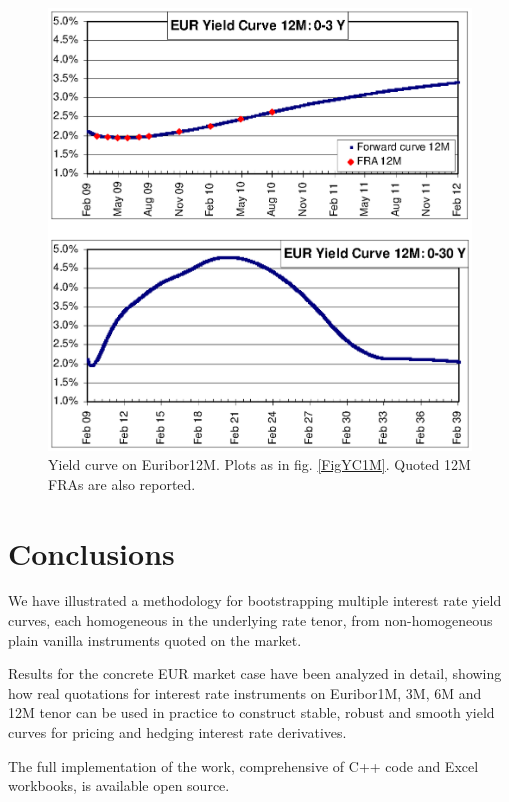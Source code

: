\documentclass[11pt,reqno]{amsart}
\begin{document}
\begin{figure}[p]
\centering
\includegraphics[scale=1.0]{../figures/FigYC12M}
\caption{Yield curve on Euribor12M. Plots as in fig. \protect\ref{FigYC1M}. Quoted 12M FRAs are also reported.}
\label{FigYC12M}
\end{figure}
\newpage

\section{Conclusions}
\label{sec:Conclusions}
We have illustrated a methodology for bootstrapping multiple interest rate yield curves, each homogeneous in the underlying rate tenor, from non-homogeneous plain vanilla instruments quoted on the market.
\par
Results for the concrete EUR market case have been analyzed in detail, showing how real quotations for interest rate instruments on Euribor1M, 3M, 6M and 12M tenor can be used in practice to construct stable, robust and smooth yield curves for pricing and hedging interest rate derivatives.
\par
The full implementation of the work, comprehensive of C++ code and Excel workbooks, is available open source.


%


\end{document}
